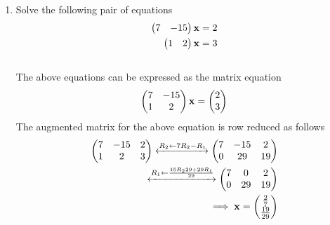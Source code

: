 \documentclass[journal,12pt,twocolumn]{IEEEtran}
\renewcommand\thesection{\arabic{section}}
\begin{document}
\begin{enumerate}[label=\thesection.\arabic*.,ref=\thesection.\theenumi]
\item Solve the following pair of equations
%
\begin{align}
\label{eq:line_check_sol_unique}
\begin{pmatrix}7 & -15\end{pmatrix}\mathbf{x}  &= 2 
\\
\begin{pmatrix} 1 & 2\end{pmatrix}\mathbf{x} &= 3
\end{align}
%
\\
\solution The above equations can be expressed as the matrix equation
\begin{align}
\begin{pmatrix}7 & -15\\1 & 2\end{pmatrix} \mathbf{x} = \begin{pmatrix}2\\ 3\end{pmatrix}
\end{align}
%
The augmented matrix for the above equation is row reduced as follows
\begin{align}
\begin{pmatrix}7 & -15 & 2\\1 & 2 & 3\end{pmatrix}
\xleftrightarrow {R_2\leftarrow 7R_2-R_1}\begin{pmatrix}7 & -15 & 2\\0 & 29 & 19\end{pmatrix}
\\
\xleftrightarrow {R_1\leftarrow \frac{15R_2 29+ 29R_1}{29}}\begin{pmatrix}7 & 0 & 2\\0 & 29 & 19\end{pmatrix} 
\\
\implies \mathbf{x} = \begin{pmatrix}\frac{2}{7}\\\frac{19}{29}\end{pmatrix}
\end{align}
%
%


\end{enumerate}
\end{document}
